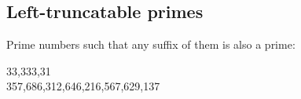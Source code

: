 \subsection{Left-truncatable primes}
Prime numbers such that any suffix of them is also a prime:
\begin{center}
33,333,31 \\
357,686,312,646,216,567,629,137
\end{center}








